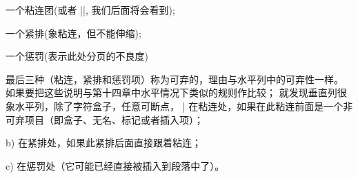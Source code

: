 \item\bull 一个粘连团(或者 |\leaders|, 我们后面将会看到);

\item\bull 一个紧排(象粘连，但不能伸缩);

\item\bull 一个惩罚(表示此处分页的不良度)

\smallskip\noindent
最后三种（粘连，紧排和惩罚项）称为可弃的，理由与水平列中的可弃性一样。
如果要把这些说明与第十四章中水平情况下类似的规则作比较；
就发现垂直列很象水平列，除了字符盒子，任意可断点，
| 在粘连处，如果在此粘连前面是一个非可弃项目（即盒子、无名、标记或者插入项）；

\smallskip
\item{b)} 在紧排处，如果此紧排后面直接跟着粘连；

\smallskip
\item{c)} 在惩罚处（它可能已经直接被插入到段落中了）。

